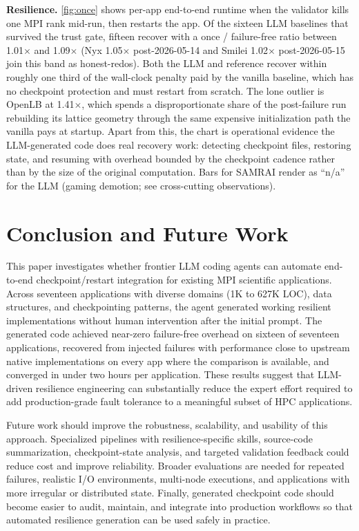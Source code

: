\documentclass[conference]{IEEEtran}
\begin{document}
\medskip
\noindent\textbf{Resilience.}
\autoref{fig:once} shows per-app end-to-end runtime when the validator kills one MPI rank mid-run, then restarts the app. Of the sixteen LLM baselines that survived the trust gate, fifteen recover with a once / failure-free ratio between 1.01$\times$ and 1.09$\times$ (Nyx 1.05$\times$ post-2026-05-14 and Smilei 1.02$\times$ post-2026-05-15 join this band as honest-redos). Both the LLM and reference recover within roughly one third of the wall-clock penalty paid by the vanilla baseline, which has no checkpoint protection and must restart from scratch. The lone outlier is OpenLB at 1.41$\times$, which spends a disproportionate share of the post-failure run rebuilding its lattice geometry through the same expensive initialization path the vanilla pays at startup. Apart from this, the chart is operational evidence the LLM-generated code does real recovery work: detecting checkpoint files, restoring state, and resuming with overhead bounded by the checkpoint cadence rather than by the size of the original computation. Bars for SAMRAI render as ``n/a'' for the LLM (gaming demotion; see cross-cutting observations).

\section{Conclusion and Future Work}
\label{sec:conclusion}

This paper investigates whether frontier LLM coding agents can automate end-to-end checkpoint/restart integration for existing MPI scientific applications. Across seventeen applications with diverse domains (1K to 627K LOC), data structures, and checkpointing patterns, the agent generated working resilient implementations without human intervention after the initial prompt. The generated code achieved near-zero failure-free overhead on sixteen of seventeen applications, recovered from injected failures with performance close to upstream native implementations on every app where the comparison is available, and converged in under two hours per application. These results suggest that LLM-driven resilience engineering can substantially reduce the expert effort required to add production-grade fault tolerance to a meaningful subset of HPC applications.

Future work should improve the robustness, scalability, and usability of this approach. Specialized pipelines with resilience-specific skills, source-code summarization, checkpoint-state analysis, and targeted validation feedback could reduce cost and improve reliability. Broader evaluations are needed for repeated failures, realistic I/O environments, multi-node executions, and applications with more irregular or distributed state. Finally, generated checkpoint code should become easier to audit, maintain, and integrate into production workflows so that automated resilience generation can be used safely in practice.
\end{document}
